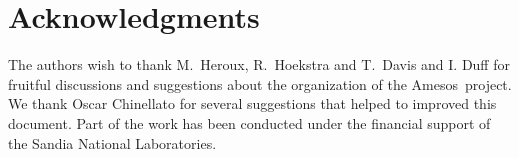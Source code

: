 \documentclass[acmtocl]{acmtrans2m}
\newcommand{\amesos}{{\sc Amesos}}
\begin{document}
\section*{Acknowledgments}

The authors wish to thank M.~Heroux, R.~Hoekstra and T.~Davis and I. Duff for
fruitful discussions and suggestions about the organization of the \amesos\
           project. We thank Oscar Chinellato for several suggestions that
           helped to improved this document.  Part of the work has been
           conducted under the financial support of the Sandia National
           Laboratories.



\end{document}
